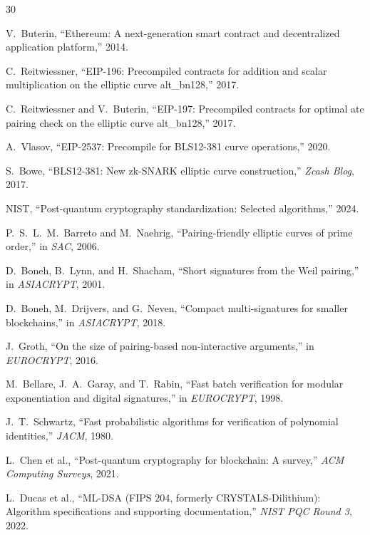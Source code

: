 
\begin{thebibliography}{30}

V.~Buterin, ``Ethereum: A next-generation smart contract and decentralized application platform,'' 2014.

C.~Reitwiessner, ``EIP-196: Precompiled contracts for addition and scalar multiplication on the elliptic curve alt\_bn128,'' 2017.

C.~Reitwiessner and V.~Buterin, ``EIP-197: Precompiled contracts for optimal ate pairing check on the elliptic curve alt\_bn128,'' 2017.

A.~Vlasov, ``EIP-2537: Precompile for BLS12-381 curve operations,'' 2020.

S.~Bowe, ``BLS12-381: New zk-SNARK elliptic curve construction,'' \emph{Zcash Blog}, 2017.

{NIST}, ``Post-quantum cryptography standardization: Selected algorithms,'' 2024.

P.~S.~L.~M.~Barreto and M.~Naehrig, ``Pairing-friendly elliptic curves of prime order,'' in \emph{SAC}, 2006.

D.~Boneh, B.~Lynn, and H.~Shacham, ``Short signatures from the Weil pairing,'' in \emph{ASIACRYPT}, 2001.

D.~Boneh, M.~Drijvers, and G.~Neven, ``Compact multi-signatures for smaller blockchains,'' in \emph{ASIACRYPT}, 2018.

J.~Groth, ``On the size of pairing-based non-interactive arguments,'' in \emph{EUROCRYPT}, 2016.

M.~Bellare, J.~A.~Garay, and T.~Rabin, ``Fast batch verification for modular exponentiation and digital signatures,'' in \emph{EUROCRYPT}, 1998.

J.~T.~Schwartz, ``Fast probabilistic algorithms for verification of polynomial identities,'' \emph{JACM}, 1980.

L.~Chen et al., ``Post-quantum cryptography for blockchain: A survey,'' \emph{ACM Computing Surveys}, 2021.

L.~Ducas et al., ``ML-DSA (FIPS 204, formerly CRYSTALS-Dilithium): Algorithm specifications and supporting documentation,'' \emph{NIST PQC Round 3}, 2022.


\end{thebibliography}
